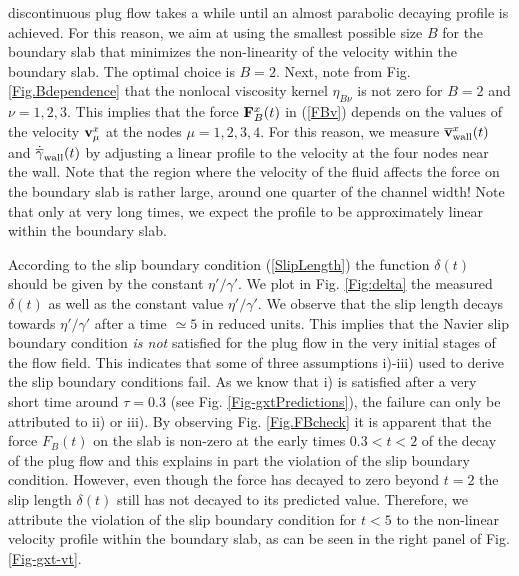 \documentclass[b5paper,openright,10pt]{book}
\begin{document}
discontinuous  plug  flow takes  a  while  until an  almost  parabolic
decaying profile  is achieved.  For  this reason,  we aim at  using the
smallest possible  size $B$ for  the boundary slab that  minimizes the
non-linearity of  the velocity within  the boundary slab.   The optimal
choice is $B=2$.  Next, note from Fig.  \ref{Fig.Bdependence} that the
nonlocal viscosity  kernel $\eta_{B\nu}$  is not  zero for  $B=2$ and
$\nu=1,2,3$.   This  implies  that   the  force  ${\bf  F}^x_B(t)$  in
(\ref{FBv}) depends on  the values of the velocity  ${\bf v}^x_\mu$ at
the nodes  $\mu=1,2,3,4$.  For this reason,  we measure $\overline{\bf
  v}^x_{\rm wall}(t)$  and $\dot{\overline{\gamma}}_{\rm  wall}(t)$ by
adjusting a linear profile to the  velocity at the four nodes near the
wall.  Note  that the region where  the velocity of the  fluid affects
the force on the boundary slab  is rather large, around one quarter of
the channel width!   Note that only at very long  times, we expect the
profile to be approximately linear within the boundary slab.


According  to  the  slip  boundary  condition  (\ref{SlipLength})  the
function $\delta(t)$ should be  given by the constant $\eta'/\gamma'$.
We plot in  Fig.  \ref{Fig:delta} the measured $\delta(t)$  as well as
the constant value  $\eta'/\gamma'$.  We observe that  the slip length
decays  towards $\eta'/\gamma'$  after a  time $\simeq  5$ in  reduced
units.   This   implies  that  the  Navier   slip  boundary  condition
\textit{is not} satisfied for the plug flow in the very initial stages
of  the flow  field. This  indicates  that some  of three  assumptions
i)-iii) used to derive the slip  boundary conditions fail.  As we know
that i)  is satisfied after a  very short time around  $\tau=0.3$ (see
Fig.  \ref{Fig-gxtPredictions}), the failure can only be attributed to ii) or
iii).  By  observing Fig.  \ref{Fig.FBcheck}  it is apparent  that the
force $F_B(t)$ on the slab is non-zero at the early times $0.3<t<2$ of
the decay of the plug flow and  this explains in part the violation of
the  slip boundary  condition.   However, even  though  the force  has
decayed to zero beyond $t=2$ the slip length $\delta(t)$ still has not
decayed to its predicted value.  Therefore, we attribute the violation
of the  slip boundary condition  for $t<5$ to the  non-linear velocity
profile within the boundary slab, as can be seen in the right panel of Fig. \ref{Fig-gxt-vt}.
\end{document}
